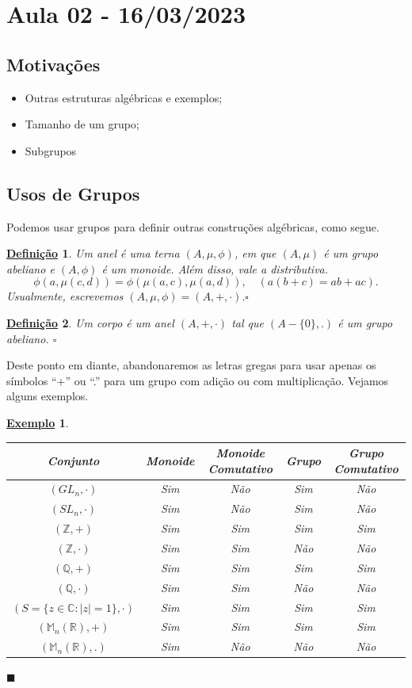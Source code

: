 \documentclass{article}
\newtheorem*{def*}{\underline{Defini\c c\~ao}}
\newtheorem{example*}{\underline{Exemplo}}
\renewcommand\qedsymbol{$\blacksquare$}
\begin{document}
\section{Aula 02 - 16/03/2023}
\subsection{Motiva\c c\~oes}
\begin{itemize}
  \item Outras estruturas alg\'ebricas e exemplos;
  \item Tamanho de um grupo;
  \item Subgrupos
\end{itemize}
\subsection{Usos de Grupos}
  Podemos usar grupos para definir outras constru\c c\~oes alg\'ebricas, como segue.
 \begin{def*}
   Um anel \'e uma terna $(A, \mu, \phi)$, em que $(A, \mu)$ \'e um grupo abeliano e $(A, \phi)$ \'e um monoide. Al\'em disso,
vale a distributiva.
   $$
    \phi(a, \mu(c, d)) = \phi(\mu(a, c), \mu(a, d)), \quad (a(b + c) = ab + ac).
   $$
   Usualmente, escrevemos $(A, \mu, \phi) = (A, +, \cdot).\square$
 \end{def*}
\begin{def*}
  Um corpo \'e um anel $(A, +, \cdot)$ tal que $(A-\{0\}, .)$ \'e um grupo abeliano. $\square$
\end{def*}
  Deste ponto em diante, abandonaremos as letras gregas para usar apenas os s\'imbolos ``+'' ou ``.'' para um grupo com adi\c c\~ao
ou com multiplica\c c\~ao. Vejamos alguns exemplos.
\begin{example*}
  \begin{center}
  \begin{tabular}{||c c c c c||}
  \hline
  Conjunto & Monoide & Monoide Comutativo & Grupo & Grupo Comutativo \\ [1ex] 
 \hline\hline
 $(GL_{n}, \cdot)$ & Sim & N\~ao & Sim & N\~ao \\ 
 \hline
 $(SL_{n}, \cdot)$ & Sim & N\~ao & Sim & N\~ao \\
 \hline
 $(\mathbb{Z}, +)$ & Sim & Sim & Sim & Sim \\
 \hline
 $(\mathbb{Z}, \cdot)$ & Sim & Sim & N\~ao & N\~ao \\
 \hline
 $(\mathbb{Q}, +)$ & Sim & Sim & Sim & Sim \\ [1ex] 
 \hline 
 $(\mathbb{Q}, \cdot)$ & Sim & Sim & N\~ao & N\~ao \\ [1ex] 
 \hline 
 $(S = \{z\in \mathbb{C}: |z| = 1\}, \cdot)$ & Sim & Sim & Sim & Sim \\ [1ex] 
 \hline 
 $(\mathbb{M}_{n}(\mathbb{R}), +)$ & Sim & Sim & Sim & Sim \\ [1ex] 
 \hline 
 $(\mathbb{M}_{n}(\mathbb{R}), .)$ & Sim & N\~ao & N\~ao & N\~ao \\ [1ex] 
 \end{tabular}
\qedsymbol
\end{center}
\end{example*}
\end{document}

